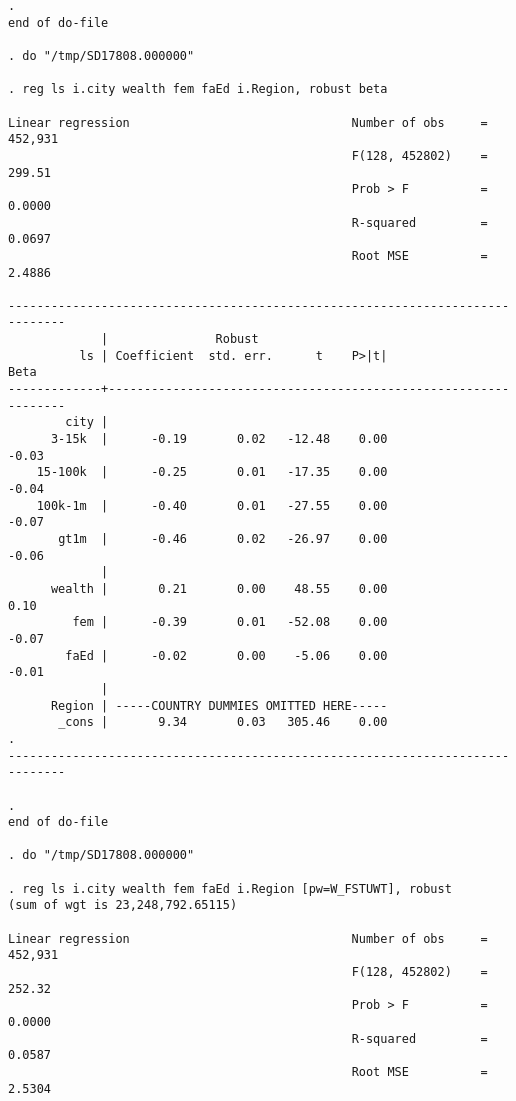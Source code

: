 \documentclass[10pt, letterpaper]{article}
\begin{document}
\begin{spacing}{1.4}
\begin{spacing}{.5}
\begin{scriptsize}
\begin{verbatim}
. 
end of do-file

. do "/tmp/SD17808.000000"

. reg ls i.city wealth fem faEd i.Region, robust beta 

Linear regression                               Number of obs     =    452,931
                                                F(128, 452802)    =     299.51
                                                Prob > F          =     0.0000
                                                R-squared         =     0.0697
                                                Root MSE          =     2.4886

------------------------------------------------------------------------------
             |               Robust
          ls | Coefficient  std. err.      t    P>|t|                     Beta
-------------+----------------------------------------------------------------
        city |
      3-15k  |      -0.19       0.02   -12.48    0.00                    -0.03
    15-100k  |      -0.25       0.01   -17.35    0.00                    -0.04
    100k-1m  |      -0.40       0.01   -27.55    0.00                    -0.07
       gt1m  |      -0.46       0.02   -26.97    0.00                    -0.06
             |
      wealth |       0.21       0.00    48.55    0.00                     0.10
         fem |      -0.39       0.01   -52.08    0.00                    -0.07
        faEd |      -0.02       0.00    -5.06    0.00                    -0.01
             |
      Region | -----COUNTRY DUMMIES OMITTED HERE-----
       _cons |       9.34       0.03   305.46    0.00                        .
------------------------------------------------------------------------------

. 
end of do-file

. do "/tmp/SD17808.000000"

. reg ls i.city wealth fem faEd i.Region [pw=W_FSTUWT], robust
(sum of wgt is 23,248,792.65115)

Linear regression                               Number of obs     =    452,931
                                                F(128, 452802)    =     252.32
                                                Prob > F          =     0.0000
                                                R-squared         =     0.0587
                                                Root MSE          =     2.5304


\end{verbatim}
\end{scriptsize}
\end{spacing}
\end{spacing}
\end{document}
